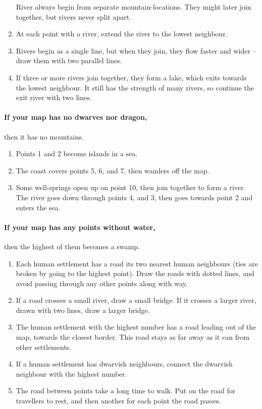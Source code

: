 \begin{multicols}{2}
\begin{enumerate}
  River always begin from separate mountain-locations.
  They might later join together, but rivers never split apart.
  \item
  At each point with a river, extend the river to the lowest neighbour.
  \item
  Rivers begin as a single line, but when they join, they flow faster and wider -- draw them with two parallel lines.
  \item
  If three or more rivers join together, they form a lake, which exits towards the lowest neighbour.
  It still has the strength of many rivers, so continue the exit river with two lines.
\end{enumerate}

\paragraph{If your map has no dwarves nor dragon,}
then it has no mountains.

\begin{enumerate}
  \item
  Points 1 and 2 become islands in a sea.
  \item
  The coast covers points 5, 6, and 7, then wanders off the map.
  \item
  Some well-springs open up on point 10, then join together to form a river.
  The river goes down through points 4, and 3, then goes towards point 2 and enters the sea.
\end{enumerate}

\paragraph{If your map has any points without water,}
then the highest of them becomes a swamp.


\begin{enumerate}
  \item
  Each human settlement has a road its two nearest human neighbours (ties are broken by going to the highest point).
  Draw the roads with dotted lines, and avoid passing through any other points along with way.
  \item
  If a road crosses a small river, draw a small bridge.
  If it crosses a larger river, drawn with two lines, draw a larger bridge.
  \item
  The human settlement with the highest number has a road leading out of the map, towards the closest border.
  This road stays as far away as it can from other settlements.
  \label{roadOut}
  \item
  If a human settlement has dwarvish neighbours, connect the dwarvish neighbour with the highest number.
  \item
  The road between points take a long time to walk.
  Put  on the road for travellers to rest, and then another for each point the road passes.
\end{enumerate}


\end{multicols}
